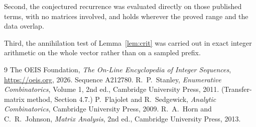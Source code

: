\documentclass[11pt,a4paper]{article}
\theoremstyle{plain}
\theoremstyle{definition}
\begin{document}
Second, the conjectured recurrence was evaluated directly on those published terms, with no
matrices involved, and holds wherever the proved range and the data overlap.

Third, the annihilation test of Lemma~\ref{lem:crit} was carried out in exact integer
arithmetic on the whole vector rather than on a sampled prefix.

\begin{thebibliography}{9}
 The OEIS Foundation, \emph{The On-Line Encyclopedia of Integer
Sequences}, \url{https://oeis.org}, 2026. Sequence A212780.
 R.~P.~Stanley, \emph{Enumerative Combinatorics}, Volume 1, 2nd ed.,
Cambridge University Press, 2011. (Transfer-matrix method, Section 4.7.)
 P.~Flajolet and R.~Sedgewick, \emph{Analytic Combinatorics}, Cambridge
University Press, 2009.
 R.~A.~Horn and C.~R.~Johnson, \emph{Matrix Analysis}, 2nd ed., Cambridge
University Press, 2013.
\end{thebibliography}
\end{document}
